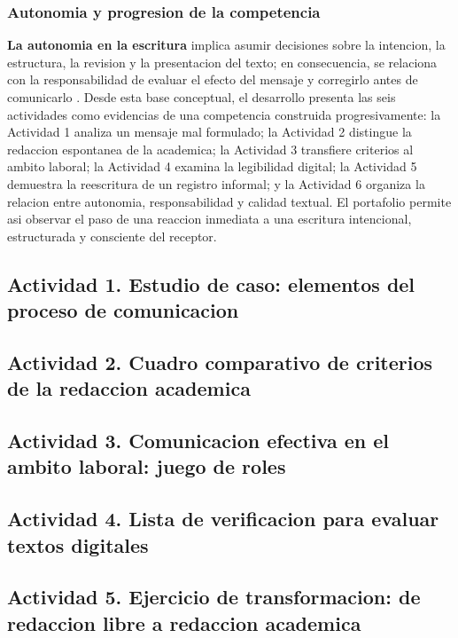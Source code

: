 \documentclass[
	spanish,
	letterpaper, oneside
]{article}
\begin{document}
\subsubsection{Autonomia y progresion de la competencia}
\textbf{La autonomia en la escritura} implica asumir decisiones sobre la intencion, la estructura, la revision y la presentacion del texto; en consecuencia, se relaciona con la responsabilidad de evaluar el efecto del mensaje y corregirlo antes de comunicarlo \citep{ayalaTallerLecturaRedaccion2010,vitoriaEscrituraAcademicaFormacion2019}. Desde esta base conceptual, el desarrollo presenta las seis actividades como evidencias de una competencia construida progresivamente: la Actividad 1 analiza un mensaje mal formulado; la Actividad 2 distingue la redaccion espontanea de la academica; la Actividad 3 transfiere criterios al ambito laboral; la Actividad 4 examina la legibilidad digital; la Actividad 5 demuestra la reescritura de un registro informal; y la Actividad 6 organiza la relacion entre autonomia, responsabilidad y calidad textual. El portafolio permite asi observar el paso de una reaccion inmediata a una escritura intencional, estructurada y consciente del receptor.

\subsection{Actividad 1. Estudio de caso: elementos del proceso de comunicacion}


\clearpage
\subsection{Actividad 2. Cuadro comparativo de criterios de la redaccion academica}


\clearpage
\subsection{Actividad 3. Comunicacion efectiva en el ambito laboral: juego de roles}


\clearpage
\subsection{Actividad 4. Lista de verificacion para evaluar textos digitales}


\clearpage
\subsection{Actividad 5. Ejercicio de transformacion: de redaccion libre a redaccion academica}

\end{document}
